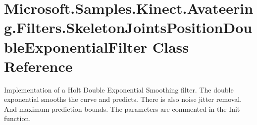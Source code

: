\hypertarget{class_microsoft_1_1_samples_1_1_kinect_1_1_avateering_1_1_filters_1_1_skeleton_joints_position_double_exponential_filter}{\section{Microsoft.\+Samples.\+Kinect.\+Avateering.\+Filters.\+Skeleton\+Joints\+Position\+Double\+Exponential\+Filter Class Reference}
\label{class_microsoft_1_1_samples_1_1_kinect_1_1_avateering_1_1_filters_1_1_skeleton_joints_position_double_exponential_filter}
}


Implementation of a Holt Double Exponential Smoothing filter. The double exponential smooths the curve and predicts. There is also noise jitter removal. And maximum prediction bounds. The parameters are commented in the Init function.  


